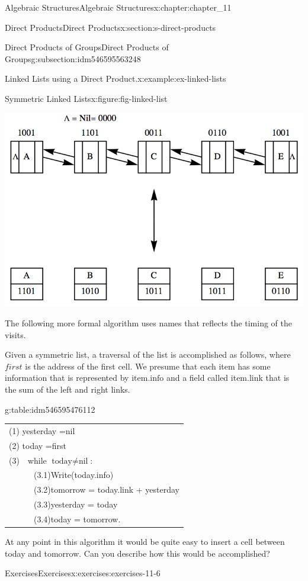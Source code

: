 \documentclass[oneside,10pt,]{book}
\newcommand{\tabularfont}{\relax}
\numberwithin{equation}{section}
\begin{document}
\begin{chapterptx}{Algebraic Structures}{}{Algebraic Structures}{}{}{x:chapter:chapter_11}
\begin{sectionptx}{Direct Products}{}{Direct Products}{}{}{x:section:s-direct-products}
\begin{subsectionptx}{Direct Products of Groups}{}{Direct Products of Groups}{}{}{g:subsection:idm546595563248}
\begin{example}{Linked Lists using a Direct Product.}{x:example:ex-linked-lists}
\begin{figureptx}{Symmetric Linked Lists}{x:figure:fig-linked-list}{}
\begin{image}{0.15}{0.7}{0.15}
\includegraphics[width=\linewidth]{images/fig-linked-list.png}
\end{image}%
\tcblower
\end{figureptx}%
The following more formal algorithm uses names that reflects the timing of the visits.%
\par
Given a symmetric list, a traversal of the list is accomplished as follows, where \(\textit{first}\) is the address of the first cell.  We presume that each item has some information that is represented by \(\textrm{item}.\textrm{info}\) and a field called item.link that is the sum of the left and right links.%
\begin{tableptx}{\textbf{}}{g:table:idm546595476112}{}%
\centering
{\tabularfont%
\begin{tabular}{l}
(1) yesterday =nil\tabularnewline[0pt]
(2) today =first\tabularnewline[0pt]
(3)\(\quad \)while \(\textrm{today} \neq  \textrm{nil}\):\tabularnewline[0pt]
\(\quad \quad \quad \)(3.1)Write(today.info)\tabularnewline[0pt]
\(\quad \quad \quad  \)(3.2)tomorrow = today.link + yesterday\tabularnewline[0pt]
\(\quad \quad \quad  \)(3.3)yesterday = today\tabularnewline[0pt]
\(\quad \quad \quad  \)(3.4)today = tomorrow.
\end{tabular}
}%
\end{tableptx}%
At any point in this algorithm it would be quite easy to insert a cell between today and tomorrow. Can you describe how this would be accomplished?%
\end{example}
\end{subsectionptx}
%
%
\typeout{************************************************}
\typeout{************************************************}
%
\begin{exercises-subsection}{Exercises}{}{Exercises}{}{}{x:exercises:exercises-11-6}

\end{exercises-subsection}
\end{sectionptx}
\end{chapterptx}
\end{document}
